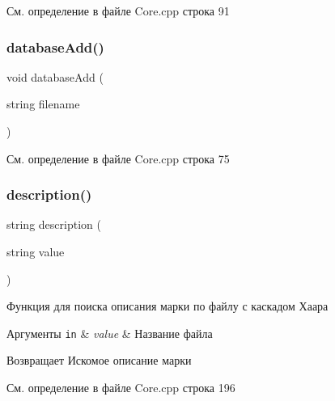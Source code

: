 См. определение в файле Core.\+cpp строка 91

\mbox{\label{group__corecpp_ga10a0271bceabc9c1a0d736ab93113212}} 
\subsubsection{\texorpdfstring{database\+Add()}{databaseAdd()}}
{\footnotesize\ttfamily void database\+Add (\begin{DoxyParamCaption}\item[{string}]{filename }\end{DoxyParamCaption})}



См. определение в файле Core.\+cpp строка 75

\mbox{\label{group__corecpp_gaa85ae460901348b74381239ce0517d5f}} 
\subsubsection{\texorpdfstring{description()}{description()}}
{\footnotesize\ttfamily string description (\begin{DoxyParamCaption}\item[{string}]{value }\end{DoxyParamCaption})}



Функция для поиска описания марки по файлу с каскадом Хаара 


\begin{DoxyParams}[1]{Аргументы}
\mbox{\tt in}  & {\em value} & Название файла \\
\hline
\end{DoxyParams}
\begin{DoxyReturn}{Возвращает}
Искомое описание марки 
\end{DoxyReturn}


См. определение в файле Core.\+cpp строка 196

\mbox{\label{group__corecpp_gae99907f19e7f09055012f68347a57d05}} 
